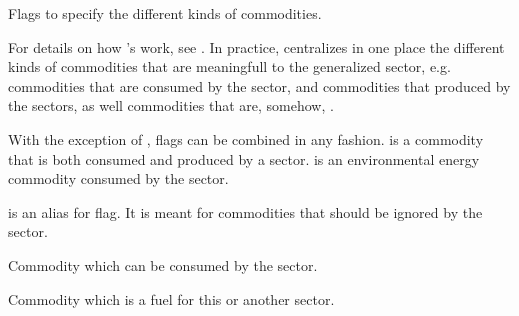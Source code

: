 \documentclass[letterpaper,10pt,english]{sphinxmanual}
\begin{document}
\begin{fulllineitems}
\label{\detokenize{api:muse.commodities.CommodityUsage}}
Flags to specify the different kinds of commodities.

For details on how ’s work, see . In practice,
 centralizes in one place the different kinds of
commodities that are meaningfull to the generalized sector, e.g. commodities that
are consumed by the sector, and commodities that produced by the sectors, as well
commodities that are, somehow, .

With the exception of , flags can be combined in any
fashion.  is a commodity that
is both consumed and produced by a sector.  is an environmental energy
commodity consumed by the sector.

 is an alias for  flag. It is meant for commodities
that should be ignored by the sector.

\begin{fulllineitems}
\label{\detokenize{api:muse.commodities.CommodityUsage.CONSUMABLE}}
Commodity which can be consumed by the sector.

\end{fulllineitems}


\begin{fulllineitems}
\label{\detokenize{api:muse.commodities.CommodityUsage.ENERGY}}
Commodity which is a fuel for this or another sector.


\end{fulllineitems}
\end{fulllineitems}
\end{document}
